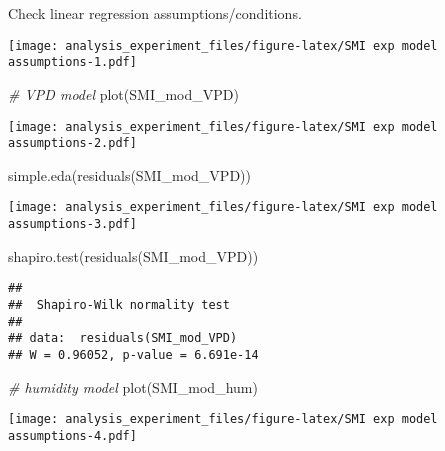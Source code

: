 \documentclass[
]{article}
\newenvironment{Shaded}{\begin{snugshade}}{\end{snugshade}}
\newcommand{\CommentTok}[1]{\textcolor[rgb]{0.56,0.35,0.01}{\textit{#1}}}
\newcommand{\FunctionTok}[1]{\textcolor[rgb]{0.00,0.00,0.00}{#1}}
\newcommand{\NormalTok}[1]{#1}
\newcommand{\SpecialCharTok}[1]{\textcolor[rgb]{0.00,0.00,0.00}{#1}}
\begin{document}
Check linear regression assumptions/conditions.

\begin{Shaded}
\end{Shaded}

\texttt{[image: analysis\_experiment\_files/figure-latex/SMI exp model assumptions-1.pdf]}

\begin{Shaded}
\begin{Highlighting}[]
\CommentTok{\# VPD model}
\FunctionTok{plot}\NormalTok{(SMI\_mod\_VPD)}
\end{Highlighting}
\end{Shaded}

\texttt{[image: analysis\_experiment\_files/figure-latex/SMI exp model assumptions-2.pdf]}

\begin{Shaded}
\begin{Highlighting}[]
\FunctionTok{simple.eda}\NormalTok{(}\FunctionTok{residuals}\NormalTok{(SMI\_mod\_VPD))}
\end{Highlighting}
\end{Shaded}

\texttt{[image: analysis\_experiment\_files/figure-latex/SMI exp model assumptions-3.pdf]}

\begin{Shaded}
\begin{Highlighting}[]
\FunctionTok{shapiro.test}\NormalTok{(}\FunctionTok{residuals}\NormalTok{(SMI\_mod\_VPD))}
\end{Highlighting}
\end{Shaded}

\begin{verbatim}
## 
##  Shapiro-Wilk normality test
## 
## data:  residuals(SMI_mod_VPD)
## W = 0.96052, p-value = 6.691e-14
\end{verbatim}

\begin{Shaded}
\begin{Highlighting}[]
\CommentTok{\# humidity model}
\FunctionTok{plot}\NormalTok{(SMI\_mod\_hum)}
\end{Highlighting}
\end{Shaded}

\texttt{[image: analysis\_experiment\_files/figure-latex/SMI exp model assumptions-4.pdf]}
\end{document}
